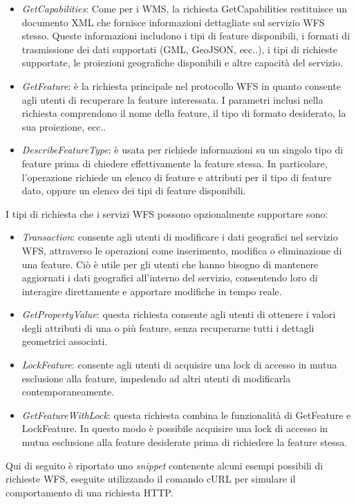 \begin{itemize}
      \item \textit{GetCapabilities}: Come per i WMS, la richiesta GetCapabilities restituisce un documento XML che fornisce informazioni dettagliate sul servizio WFS stesso. Queste informazioni includono i tipi di feature disponibili, i formati di trasmissione dei dati supportati (GML, GeoJSON, ecc..), i tipi di richieste supportate, le proiezioni geografiche disponibili e altre capacità del servizio.
      \item \textit{GetFeature}: è la richiesta principale nel protocollo WFS in quanto consente agli utenti di recuperare la feature interessata. I parametri inclusi nella richiesta comprendono il nome della feature, il tipo di formato desiderato, la sua proiezione, ecc..
      \item \textit{DescribeFeatureType}: è usata per richiede informazioni su un singolo tipo di feature prima di chiedere effettivamente la feature stessa. In particolare, l'operazione richiede un elenco di feature e attributi per il tipo di feature dato, oppure un elenco dei tipi di feature disponibili.
\end{itemize}
I tipi di richiesta che i servizi WFS possono opzionalmente supportare sono:
\begin{itemize}
      \item \textit{Transaction}: consente agli utenti di modificare i dati geografici nel servizio WFS, attraverso le operazioni come inserimento, modifica o eliminazione di una feature. Ciò è utile per gli utenti che hanno bisogno di mantenere aggiornati i dati geografici all'interno del servizio, consentendo loro di interagire direttamente e apportare modifiche in tempo reale.
      \item \textit{GetPropertyValue}: questa richiesta consente agli utenti di ottenere i valori degli attributi di una o più feature, senza recuperarne tutti i dettagli geometrici associati.
      \item \textit{LockFeature}: consente agli utenti di acquisire una lock di accesso in mutua esclusione alla feature, impedendo ad altri utenti di modificarla contemporaneamente.
      \item \textit{GetFeatureWithLock}: questa richiesta combina le funzionalità di GetFeature e LockFeature. In questo modo è possibile acquisire una lock di accesso in mutua esclusione alla feature desiderate prima di richiedere la feature stessa.
\end{itemize}
Qui di seguito è riportato uno \textit{snippet} contenente alcuni esempi possibili di richieste WFS, eseguite utilizzando il comando cURL per simulare il comportamento di una richiesta HTTP.

